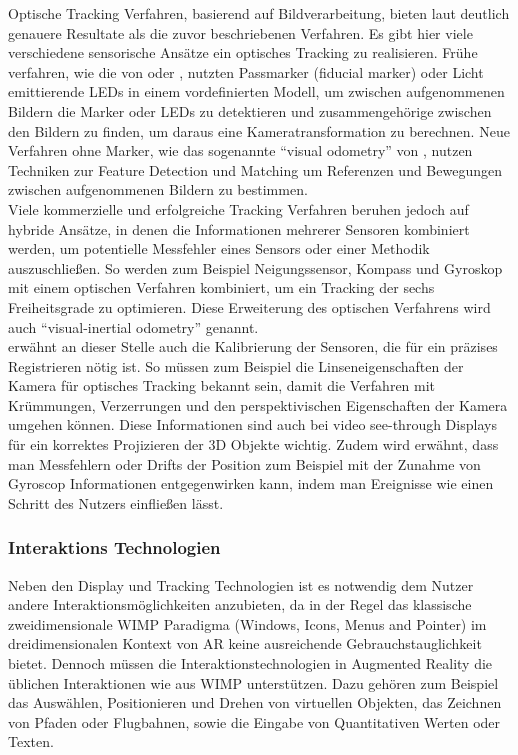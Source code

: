 Optische Tracking Verfahren, basierend auf Bildverarbeitung, bieten laut \citet{van2010survey} deutlich genauere Resultate als die zuvor beschriebenen Verfahren. Es gibt hier viele verschiedene sensorische Ansätze ein optisches Tracking zu realisieren. Frühe verfahren, wie die von \citet{dunston2008identification} oder \citet{narzt2006augmented}, nutzten Passmarker (fiducial marker) oder Licht emittierende LEDs in einem vordefinierten Modell, um zwischen aufgenommenen Bildern die Marker oder LEDs zu detektieren und zusammengehörige zwischen den Bildern zu finden, um daraus eine Kameratransformation zu berechnen. Neue Verfahren ohne Marker, wie das sogenannte \enquote{visual odometry} von \citet{nister2004visual}, nutzen Techniken zur Feature Detection und Matching um Referenzen und Bewegungen zwischen aufgenommenen Bildern zu bestimmen.\\

Viele kommerzielle und erfolgreiche Tracking Verfahren beruhen jedoch auf hybride Ansätze, in denen die Informationen mehrerer Sensoren kombiniert werden, um potentielle Messfehler eines Sensors oder einer Methodik auszuschließen. So werden zum Beispiel Neigungssensor, Kompass und Gyroskop mit einem optischen Verfahren kombiniert, um ein Tracking der sechs Freiheitsgrade zu optimieren. Diese Erweiterung des optischen Verfahrens wird auch \enquote{visual-inertial odometry} genannt. \citep{van2010survey}\\

\citet{azuma2001recent} erwähnt an dieser Stelle auch die Kalibrierung der Sensoren, die für ein präzises Registrieren nötig ist. So müssen zum Beispiel die Linseneigenschaften der Kamera für optisches Tracking bekannt sein, damit die Verfahren mit Krümmungen, Verzerrungen und den perspektivischen Eigenschaften der Kamera umgehen können. Diese Informationen sind auch bei video see-through Displays für ein korrektes Projizieren der 3D Objekte wichtig. Zudem wird erwähnt, dass man Messfehlern oder Drifts der Position zum Beispiel mit der Zunahme von Gyroscop Informationen entgegenwirken kann, indem man Ereignisse wie einen Schritt des Nutzers einfließen lässt. \citep{azuma2001recent} \\

\subsubsection{Interaktions Technologien} \label{sec:ar-interaction}

Neben den Display und Tracking Technologien ist es notwendig dem Nutzer andere Interaktionsmöglichkeiten anzubieten, da in der Regel das klassische zweidimensionale WIMP Paradigma (Windows, Icons, Menus and Pointer) im dreidimensionalen Kontext von AR keine ausreichende Gebrauchstauglichkeit bietet. Dennoch müssen die Interaktionstechnologien in Augmented Reality die üblichen Interaktionen wie aus WIMP unterstützen. Dazu gehören zum Beispiel das Auswählen, Positionieren und Drehen von virtuellen Objekten, das Zeichnen von Pfaden oder Flugbahnen, sowie die Eingabe von Quantitativen Werten oder Texten. \citep{van2010survey} \\

